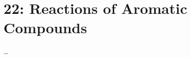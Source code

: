 
\chapter{22: Reactions of Aromatic Compounds}\label{22: Reactions of Aromatic Compounds}
\begin{adjustwidth}{1cm}{1cm}
  \dots
\end{adjustwidth}


